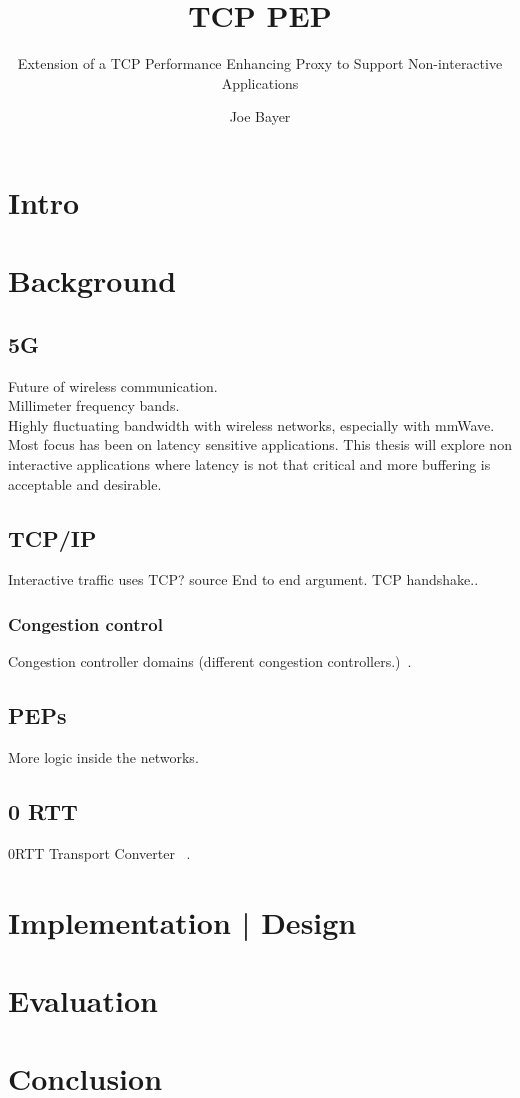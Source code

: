 \documentclass[a4paper,english, 11pt]{report}
\author{Joe Bayer}
\title{TCP PEP}
\subtitle{Extension of a TCP Performance Enhancing Proxy to
Support Non-interactive Applications}
\begin{document}
\uiomasterfp[program={Informatikk: programmering og systemarkitektur}, supervisor={Michael Welzl}]

\tableofcontents

\chapter{Intro}

\chapter{Background}

\section{5G}
Future of wireless communication.\\
Millimeter frequency bands.\\
Highly fluctuating bandwidth with wireless networks, especially with mmWave.\\

Most focus has been on latency sensitive applications. This thesis will explore non interactive applications where latency is not that critical and more buffering is acceptable and desirable.


\section{TCP/IP}

Interactive traffic uses TCP? {source}
End to end argument.
TCP handshake..
\subsection{Congestion control}
Congestion controller domains (different congestion controllers.)~\cite{rfc5783}.

\section{PEPs}
More logic inside the networks.
\section{0 RTT}

0RTT Transport Converter ~\cite{rfc8803}.



\chapter{Implementation | Design}
\chapter{Evaluation}
\chapter{Conclusion}

{}

\end{document}

